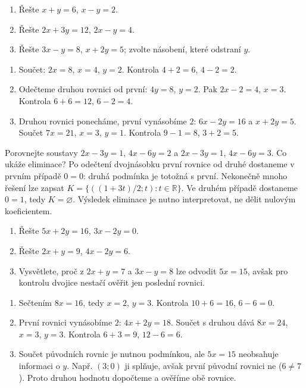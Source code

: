 \documentclass[11pt,a4paper]{article}
\begin{document}
\begin{zadaniReseniBox}
\begin{enumerate}[label=\alph*)]
\item Řešte $x+y=6$, $x-y=2$.
\item Řešte $2x+3y=12$, $2x-y=4$.
\item Řešte $3x-y=8$, $x+2y=5$; zvolte násobení, které odstraní $y$.
\end{enumerate}
\tcblower
\begin{enumerate}[label=\alph*)]
\item Součet: $2x=8$, $x=4$, $y=2$. Kontrola $4+2=6$, $4-2=2$.
\item Odečteme druhou rovnici od první: $4y=8$, $y=2$. Pak $2x-2=4$, $x=3$. Kontrola $6+6=12$, $6-2=4$.
\item Druhou rovnici ponecháme, první vynásobíme $2$: $6x-2y=16$ a $x+2y=5$. Součet $7x=21$, $x=3$, $y=1$. Kontrola $9-1=8$, $3+2=5$.
\end{enumerate}
\end{zadaniReseniBox}
\begin{zadaniReseniBox}
Porovnejte soustavy $2x-3y=1$, $4x-6y=2$ a $2x-3y=1$, $4x-6y=3$. Co ukáže eliminace?
\tcblower
Po odečtení dvojnásobku první rovnice od druhé dostaneme v prvním případě $0=0$: druhá podmínka je totožná s první. Nekonečně mnoho řešení lze zapsat $K=\{((1+3t)/2;t):t\in\mathbb R\}$. Ve druhém případě dostaneme $0=1$, tedy $K=\varnothing$. Výsledek eliminace je nutno interpretovat, ne dělit nulovým koeficientem.
\end{zadaniReseniBox}
\begin{zadaniReseniBox}
\begin{enumerate}[label=\alph*)]
\item Řešte $5x+2y=16$, $3x-2y=0$.
\item Řešte $2x+y=9$, $4x-2y=6$.
\item Vysvětlete, proč z $2x+y=7$ a $3x-y=8$ lze odvodit $5x=15$, avšak pro kontrolu dvojice nestačí ověřit jen poslední rovnici.
\end{enumerate}
\tcblower
\begin{enumerate}[label=\alph*)]
\item Sečtením $8x=16$, tedy $x=2$, $y=3$. Kontrola $10+6=16$, $6-6=0$.
\item První rovnici vynásobíme $2$: $4x+2y=18$. Součet s druhou dává $8x=24$, $x=3$, $y=3$. Kontrola $6+3=9$, $12-6=6$.
\item Součet původních rovnic je nutnou podmínkou, ale $5x=15$ neobsahuje informaci o $y$. Např. $(3;0)$ ji splňuje, avšak první původní rovnici ne ($6\ne7$). Proto druhou hodnotu dopočteme a ověříme obě rovnice.
\end{enumerate}
\end{zadaniReseniBox}
\end{document}
